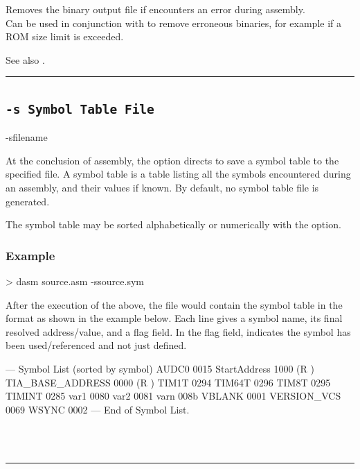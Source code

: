 \label{changelog:20200908optionR}
Removes the binary output file if \dasm encounters an error during assembly.\\

Can be used in conjunction with  to remove erroneous binaries, for example if a ROM size limit is exceeded.

See also .
\\


\hrule

\subsection{\texttt{-s Symbol Table File}}
\label{flag:symboltable}

\begin{usage}
-sfilename
\end{usage}

At the conclusion of assembly, the  option directs \dasm to save a symbol table to the specified file. A symbol table is a table listing all the symbols encountered during an assembly, and their values if known. By default, no symbol table file is generated.

The symbol table may be sorted alphabetically or numerically with the  option.


\subsubsection{Example}

\begin{outputx}
> dasm source.asm -ssource.sym
\end{outputx}

After the execution of the above, the file  would contain the symbol table in the format as shown in the example below. Each line gives a symbol name, its final resolved address/value, and a flag field. In the flag field,   indicates the symbol has been used/referenced and not just defined.

\begin{code}
--- Symbol List (sorted by symbol)
AUDC0                    0015                  
StartAddress             1000              (R )
TIA_BASE_ADDRESS         0000              (R )
TIM1T                    0294                  
TIM64T                   0296                  
TIM8T                    0295                  
TIMINT                   0285                  
var1                     0080                  
var2                     0081                  
varn                     008b                  
VBLANK                   0001                  
VERSION_VCS              0069                  
WSYNC                    0002                  
--- End of Symbol List.
\end{code}
\\
\\
\hrule

